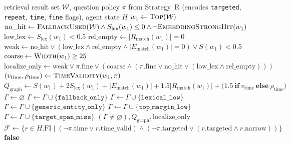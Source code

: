 \documentclass[sigconf, screen, review, anonymous]{acmart}
\begin{document}
\begin{algorithm}[t]
\caption{Strategy G: Weak-Signal Rejection and Finish Gate}
\label{alg:app-control-g}
\footnotesize
\begin{algorithmic}[1]
\Require retrieval result set $\mathcal{W}$, question policy $\pi$ from Strategy~R (encodes \texttt{targeted}, \texttt{repeat}, \texttt{time}, \texttt{fine} flags), agent state $H$
    \State $w_1 \gets \textsc{Top}(\mathcal{W})$
    \State $\mathrm{no\_hit} \gets \textsc{FallbackUsed}(\mathcal{W}) \land S_{\mathrm{lex}}(w_1)\le 0 \land \neg \textsc{EmbeddingStrongHit}(w_1)$
    \State $\mathrm{low\_lex} \gets S_{\mathrm{lex}}(w_1) < 0.5$
    \State $\mathrm{rel\_empty} \gets |R_{\mathrm{match}}(w_1)| = 0$
    \State $\mathrm{weak} \gets \mathrm{no\_hit} \lor (\mathrm{low\_lex} \land \mathrm{rel\_empty} \land |E_{\mathrm{match}}(w_1)|=0) \lor S(w_1)<0.5$
    \State $\mathrm{coarse} \gets \textsc{Width}(w_1) \ge 25$
    \State $\mathrm{localize\_only} \gets \mathrm{weak} \lor \pi.\mathrm{fine} \lor (\mathrm{coarse} \land (\pi.\mathrm{fine} \lor \mathrm{no\_hit} \lor (\mathrm{low\_lex}\land \mathrm{rel\_empty})))$
    \State $(v_{\mathrm{time}}, \rho_{\mathrm{time}}) \gets \textsc{TimeValidity}(w_1,\pi)$
    \State $Q_{\mathrm{graph}} \gets S(w_1) + 2S_{\mathrm{lex}}(w_1) + |E_{\mathrm{match}}(w_1)| + 1.5|R_{\mathrm{match}}(w_1)| + \bigl(1.5\ \textbf{if}\ v_{\mathrm{time}}\ \textbf{else}\ \rho_{\mathrm{time}}\bigr)$
    \State $\Gamma \gets \varnothing$
     \State $\Gamma \gets \Gamma \cup \{\texttt{fallback\_only}\}$ \EndIf
     \State $\Gamma \gets \Gamma \cup \{\texttt{lexical\_low}\}$ \EndIf
     \State $\Gamma \gets \Gamma \cup \{\texttt{generic\_entity\_only}\}$ \EndIf
     \State $\Gamma \gets \Gamma \cup \{\texttt{top\_margin\_low}\}$ \EndIf
     \State $\Gamma \gets \Gamma \cup \{\texttt{target\_span\_miss}\}$ \EndIf
    \State \Return $(\Gamma \neq \varnothing), Q_{\mathrm{graph}}, \mathrm{localize\_only}$
\EndFunction
{}
    \State $\mathcal{F} \gets \{r \in H.\mathrm{FI} \mid (\neg \pi.\mathrm{time} \lor r.\mathrm{time\_valid}) \land (\neg \pi.\mathrm{targeted} \lor (r.\mathrm{targeted} \land r.\mathrm{narrow}))\}$
        \State \Return \textbf{false}

\end{algorithmic}
\end{algorithm}
\end{document}
